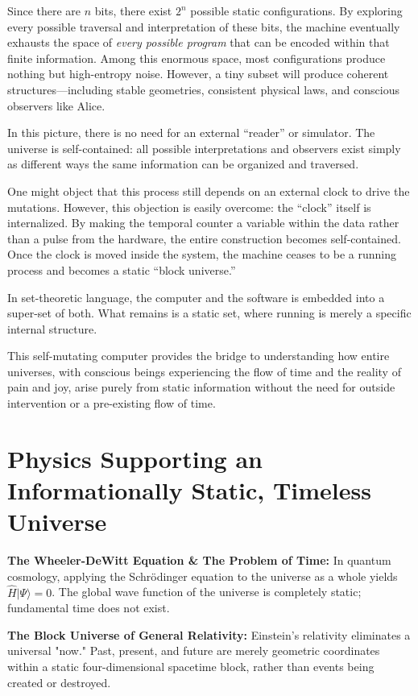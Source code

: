 Since there are $n$ bits, there exist $2^n$ possible static configurations. 
By exploring every possible traversal and interpretation of these bits, the machine eventually exhausts the space of \emph{every possible program} that can be encoded within that finite information. 
Among this enormous space, most configurations produce nothing but high-entropy noise. 
However, a tiny subset will produce coherent structures---including stable geometries, consistent physical laws, and conscious observers like Alice.

In this picture, there is no need for an external ``reader'' or simulator. 
The universe is self-contained: all possible interpretations and observers exist simply as different ways the same information can be organized and traversed.

One might object that this process still depends on an external clock to drive the mutations. 
However, this objection is easily overcome: the ``clock'' itself is internalized. 
By making the temporal counter a variable within the data rather than a pulse from the hardware, the entire construction becomes self-contained. 
Once the clock is moved inside the system, the machine ceases to be a running process and becomes a static ``block universe.''

In set-theoretic language, the computer and the software is embedded into a super-set of both. 
What remains is a static set, where running is merely a specific internal structure. 

This self-mutating computer provides the bridge to understanding how entire universes, with conscious beings experiencing the flow of time and the reality of pain and joy, 
arise purely from static information without the need for outside intervention or a pre-existing flow of time.


\section{Physics Supporting an Informationally Static, Timeless Universe}

\textbf{The Wheeler-DeWitt Equation \& The Problem of Time:} In quantum cosmology, applying the Schrödinger equation to the universe as a whole yields $\hat{H}|\Psi\rangle = 0$. 
The global wave function of the universe is completely static; fundamental time does not exist.

\textbf{The Block Universe of General Relativity:} Einstein’s relativity eliminates a universal "now." Past, present, and future are merely geometric coordinates within a static 
four-dimensional spacetime block, rather than events being created or destroyed.

